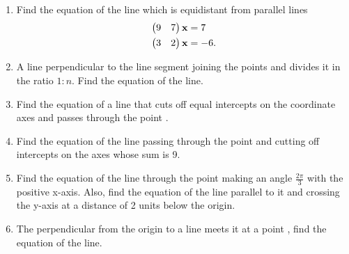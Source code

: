 \documentclass[journal,12pt,twocolumn]{IEEEtran}
\renewcommand\thesection{\arabic{section}}
\begin{document}
\begin{enumerate}[label=\thesection.\arabic*.,ref=\thesection.\theenumi]
\item Find the equation of the line which is equidistant from parallel lines
%
\begin{align}
\begin{pmatrix}9 & 7\end{pmatrix}\mathbf{x} &= 7
\\
\begin{pmatrix}3 & 2\end{pmatrix}\mathbf{x} &= -6.
\end{align}
%
\solution
%
\item A line perpendicular to the line segment joining the points  and  divides it in the ratio $1:n$.  Find the equation of the line.
\\
\solution
%

\item Find the equation of a line that cuts off equal intercepts on the coordinate axes and passes through the point .
\\
\solution
%
\item Find the equation of the line passing through the point  and cutting off intercepts on the axes whose sum is 9.
\item Find the equation of the line through the point  making an angle $\frac{2\pi}{3}$ with the positive x-axis.  Also, find the equation of the line parallel to it and crossing the y-axis at a distance of 2 units below the origin.
\\
\solution
%
%
\item The perpendicular from the origin to a line meets it at a point , find the equation of the line.
\\
\solution
%


\end{enumerate}
\end{document}
